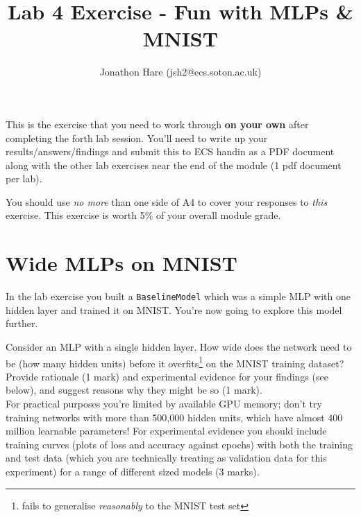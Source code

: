 \documentclass[a4paper]{article}
\begin{document}
\lstset{language=Python,upquote=true}

\setlength{\leftskip}{20pt}
\title{Lab 4 Exercise - Fun with MLPs \& MNIST}
\author{Jonathon Hare (jsh2@ecs.soton.ac.uk)}

\maketitle


This is the exercise that you need to work through \textbf{on your own} after completing the forth lab session. You'll need to write up your results/answers/findings and submit this to ECS handin as a PDF document along with the other lab exercises near the end of the module (1 pdf document per lab). 

You should use \emph{no more} than one side of A4 to cover your responses to \emph{this} exercise. This exercise is worth 5\% of your overall module grade.

\section{Wide MLPs on MNIST}\label{wide}

In the lab exercise you built a \texttt{BaselineModel} which was a simple MLP with one hidden layer and trained it on MNIST. You're now going to explore this model further.

\begin{tcolorbox}[title=1.1 Wider MLPs (5 marks)]
Consider an MLP with a single hidden layer. How wide does the network need to be (how many hidden units) before it overfits\footnote{fails to generalise \emph{reasonably} to the MNIST test set} on the MNIST training dataset? Provide rationale (1 mark) and experimental evidence for your findings (see below), and suggest reasons why they might be so (1 mark).
\\[1em]
For practical purposes you're limited by available GPU memory; don't try training networks with more than 500,000 hidden units, which have almost 400 million learnable parameters! For experimental evidence you should include training curves (plots of loss and accuracy against epochs) with both the training and test data (which you are technically treating as validation data for this experiment) for a range of different sized models (3 marks).
\end{tcolorbox}
\end{document}
